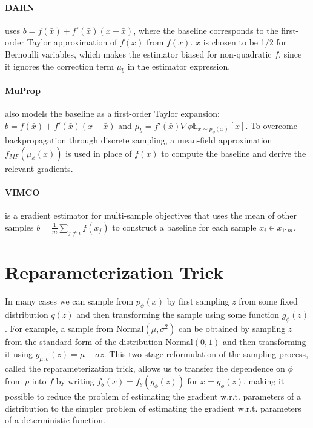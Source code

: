 \documentclass[11pt,a4paper]{article}
\begin{document}
\paragraph{DARN \citep{gregor2013deep}} uses $b = f(\bar{x}) + f'(\bar{x})(x - \bar{x})$, where the baseline corresponds to the first-order Taylor approximation of $f(x)$ from $f(\bar{x})$. $x$ is chosen to be 1/2 for Bernoulli variables, which makes the estimator biased for non-quadratic $f$, since it ignores the correction term $\mu_b$ in the estimator expression.

\paragraph{MuProp \citep{gu2015muprop}} also models the baseline as a first-order Taylor expansion: $b = f(\bar{x}) + f'(\bar{x})(x - \bar{x})$ and $\mu_b = f'(\bar{x})\nabla\phi \mathbb{E}_{x\sim p_\phi(x)} [x]$. To overcome backpropagation through discrete sampling, a mean-field approximation $f_{MF} (\mu_\phi(x))$ is used in place of $f(x)$ to compute the baseline and derive the relevant gradients.

\paragraph{VIMCO \citep{mnih2016variational}} is a gradient estimator for multi-sample objectives that uses the mean of other samples $b = \frac{1}{m}\sum_{j\neq i} f(x_j)$ to construct a baseline for each sample $x_i \in x_{1:m}$.

\section{Reparameterization Trick}

In many cases we can sample from $p_\phi(x)$ by first sampling $z$ from some fixed distribution $q(z)$ and then transforming the sample using some function $g_\phi(z)$. For example, a sample from $\text{Normal}(\mu,\sigma^2)$ can be obtained by sampling $z$ from the standard form of the distribution $\text{Normal}(0, 1)$ and then transforming it using $g_{\mu,\sigma}(z) = \mu + \sigma z$. This two-stage reformulation of the sampling process, called the reparameterization trick, allows us to transfer the dependence on $\phi$ from $p$ into $f$ by writing $f_\theta(x) = f_\theta(g_\phi(z))$ for $x = g_\phi(z)$, making it possible to reduce the problem of estimating the gradient w.r.t. parameters of a distribution to the simpler problem of estimating the gradient w.r.t. parameters of a deterministic function.
\end{document}
